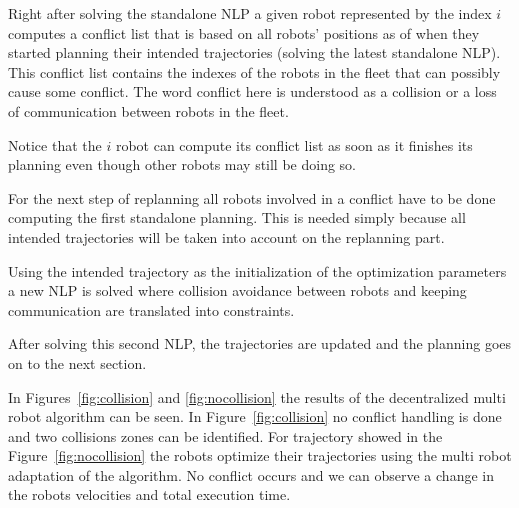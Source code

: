 \documentclass[eprint]{actapoly}
\begin{document}
Right after solving the standalone NLP a given robot represented by the index $i$ computes a conflict list that is based on 
all robots' positions as of when they started planning their intended trajectories (solving the latest standalone NLP).
This conflict list contains the indexes of
the robots in the fleet that can possibly cause some conflict. The word conflict here is understood as a collision or a loss of communication
between robots in the fleet.

Notice that the $i$ robot can compute its conflict list as soon as it finishes its planning even though other robots may still be doing so.

For the next step of replanning all robots involved in a conflict have to be done computing the first standalone planning. This is needed simply because
all intended trajectories will be taken into account on the replanning part.

Using the intended trajectory as the initialization of the optimization parameters a new NLP is solved where collision avoidance between robots
and keeping communication are translated into constraints.

After solving this second NLP, the trajectories are updated and the planning goes on to the next section.

In Figures~\ref{fig:collision} and \ref{fig:nocollision} the results of the decentralized multi robot algorithm can be seen.
In Figure~\ref{fig:collision} no conflict handling is done and two collisions zones can be identified.
For trajectory showed in the Figure~\ref{fig:nocollision} the robots optimize their trajectories using the multi robot
adaptation of the algorithm. No conflict occurs and we can observe a change in the robots velocities and total execution time.


\end{document}
